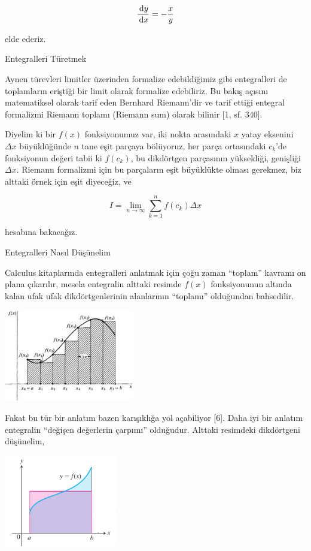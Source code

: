 \documentclass[12pt,fleqn]{article}\usepackage{../../common}
\begin{document}
$$
\frac{\,\mathrm{d} y}{\,\mathrm{d} x} = -\frac{x}{y}
$$

elde ederiz.

Entegralleri Türetmek

Aynen türevleri limitler üzerinden formalize edebildiğimiz gibi
entegralleri de toplamların eriştiği bir limit olarak formalize
edebiliriz. Bu bakış açısını matematiksel olarak tarif eden Bernhard
Riemann'dir ve tarif ettiği entegral formalizmi Riemann toplamı (Riemann
sum) olarak bilinir [1, sf. 340]. 

Diyelim ki bir $f(x)$ fonksiyonumuz var, iki nokta arasındaki $x$ yatay
eksenini $\Delta x$ büyüklüğünde $n$ tane eşit parçaya bölüyoruz, her parça
ortasındaki $c_k$'de fonksiyonun değeri tabii ki $f(c_k)$, bu dikdörtgen
parçasının yüksekliği, genişliği $\Delta x$. Riemann formalizmi için bu
parçaların eşit büyüklükte olması gerekmez, biz alttaki örnek için eşit
diyeceğiz, ve

$$ 
I = \lim_{n \to \infty} \sum_{k=1}^{n} f(c_k) \Delta x
$$

hesabına bakacağız.

Entegralleri Nasıl Düşünelim

Calculus kitaplarında entegralleri anlatmak için çoğu zaman ``toplam''
kavramı on plana çıkarılır, mesela entegralin alttaki resimde $f(x)$
fonksiyonunun altında kalan ufak ufak dikdörtgenlerinin alanlarının
``toplamı'' olduğundan bahsedilir.

\includegraphics[height=4cm]{area.png}

Fakat bu tür bir anlatım bazen karışıklığa yol açabiliyor [6]. Daha iyi bir
anlatım entegralin ``değişen değerlerin çarpımı'' olduğudur. Alttaki
resimdeki dikdörtgeni düşünelim, 

\includegraphics[height=4cm]{box.png}
\end{document}
